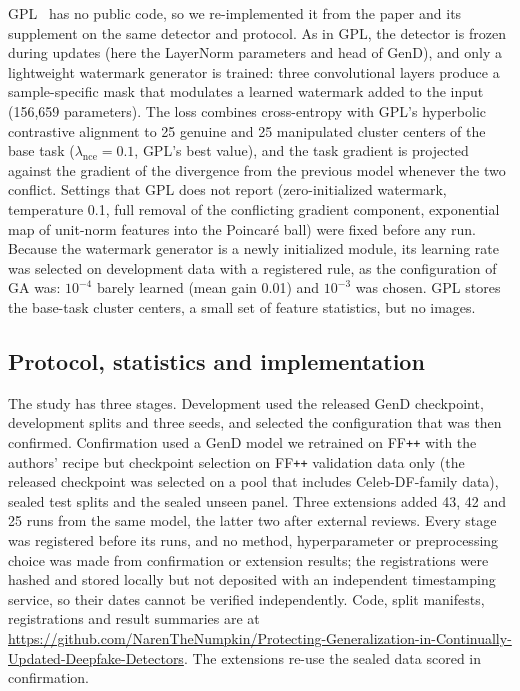 \documentclass[journal]{IEEEtran}
\newcommand{\ffpp}{FF\texttt{++}}
\begin{document}
GPL~\cite{zhang2025gpl} has no public code, so we re-implemented it from the paper and its supplement on the same detector and protocol. As in GPL, the detector is frozen during updates (here the LayerNorm parameters and head of GenD), and only a lightweight watermark generator is trained: three convolutional layers produce a sample-specific mask that modulates a learned watermark added to the input (156{,}659 parameters). The loss combines cross-entropy with GPL's hyperbolic contrastive alignment to 25 genuine and 25 manipulated cluster centers of the base task ($\lambda_{\mathrm{nce}}=0.1$, GPL's best value), and the task gradient is projected against the gradient of the divergence from the previous model whenever the two conflict. Settings that GPL does not report (zero-initialized watermark, temperature 0.1, full removal of the conflicting gradient component, exponential map of unit-norm features into the Poincar\'e ball) were fixed before any run. Because the watermark generator is a newly initialized module, its learning rate was selected on development data with a registered rule, as the configuration of GA was: $10^{-4}$ barely learned (mean gain 0.01) and $10^{-3}$ was chosen. GPL stores the base-task cluster centers, a small set of feature statistics, but no images.

\subsection{Protocol, statistics and implementation}
The study has three stages. Development used the released GenD checkpoint, development splits and three seeds, and selected the configuration that was then confirmed. Confirmation used a GenD model we retrained on \ffpp{} with the authors' recipe but checkpoint selection on \ffpp{} validation data only (the released checkpoint was selected on a pool that includes Celeb-DF-family data), sealed test splits and the sealed unseen panel. Three extensions added 43, 42 and 25 runs from the same model, the latter two after external reviews. Every stage was registered before its runs, and no method, hyperparameter or preprocessing choice was made from confirmation or extension results; the registrations were hashed and stored locally but not deposited with an independent timestamping service, so their dates cannot be verified independently. Code, split manifests, registrations and result summaries are at \url{https://github.com/NarenTheNumpkin/Protecting-Generalization-in-Continually-Updated-Deepfake-Detectors}. The extensions re-use the sealed data scored in confirmation.
\end{document}
